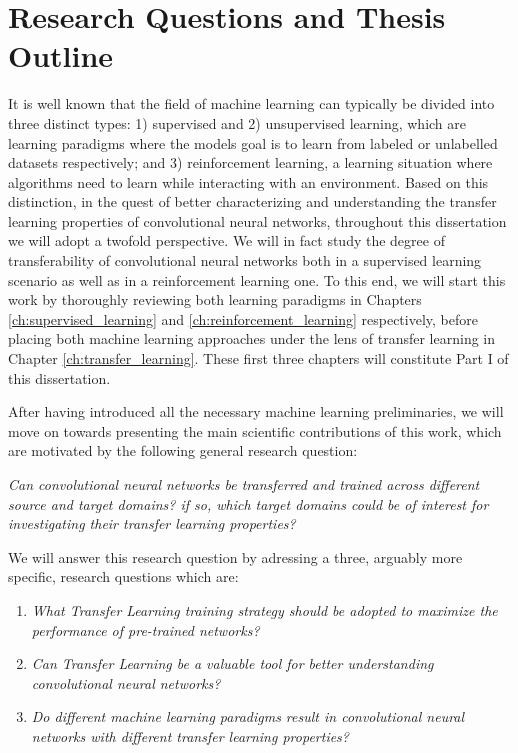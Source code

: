 \section*{Research Questions and Thesis Outline}
It is well known that the field of machine learning can typically be divided into three distinct types: 1) supervised and 2) unsupervised learning, which are learning paradigms where the models goal is to learn from labeled or unlabelled datasets respectively; and 3) reinforcement learning, a learning situation where algorithms need to learn while interacting with an environment. Based on this distinction, in the quest of better characterizing and understanding the transfer learning properties of convolutional neural networks, throughout this dissertation we will adopt a twofold perspective. We will in fact study the degree of transferability of convolutional neural networks both in a supervised learning scenario as well as in a reinforcement learning one. To this end, we will start this work by thoroughly reviewing both learning paradigms in Chapters \ref{ch:supervised_learning} and \ref{ch:reinforcement_learning} respectively, before placing both machine learning approaches under the lens of transfer learning in Chapter \ref{ch:transfer_learning}. These first three chapters will constitute Part I of this dissertation.

After having introduced all the necessary machine learning preliminaries, we will move on towards presenting the main scientific contributions of this work, which are motivated by the following general research question:
\begin{center}
	\textit{Can convolutional neural networks be transferred and trained across different source and target domains? if so, which target domains could be of interest for investigating their transfer learning properties?}	
\end{center}    

We will answer this research question by adressing a three, arguably more specific, research questions which are:
\begin{enumerate}
	\item \textit{What Transfer Learning training strategy should be adopted to maximize the performance of pre-trained networks?}

	\item \textit{Can Transfer Learning be a valuable tool for better understanding convolutional neural networks?}
	
	\item \textit{Do different machine learning paradigms result in convolutional neural networks with different transfer learning properties?}
\end{enumerate}

